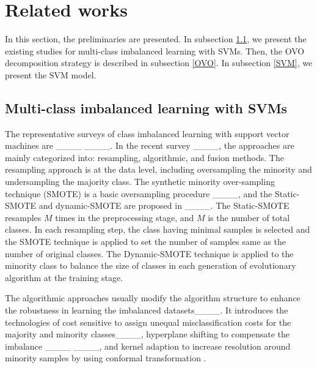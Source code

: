 \section{Related works}
\label{RelatedWork}

In this section, the preliminaries are presented. In subsection \ref{ImbalancedDatasets}, we present the existing studies for multi-class imbalanced learning with SVMs. Then, the OVO decomposition strategy is described in subsection \ref{OVO}. In subsection \ref{SVM}, we present the SVM model. 


\subsection{Multi-class imbalanced learning with SVMs}
\label{ImbalancedDatasets}


The representative surveys of class imbalanced learning with support vector machines are ____ ____. In the recent survey ____, the approaches are mainly categorized into: resampling, algorithmic, and fusion methods. The resampling approach is at the data level, including oversampling the minority and undersampling the majority class. The synthetic minority over-sampling technique (SMOTE) is a basic oversampling procedure ____, and the Static-SMOTE and dynamic-SMOTE are proposed in ____. The Static-SMOTE resamples $M$ times in the preprocessing stage, and $M$ is the number of total classes. In each resampling step, the class having minimal samples is selected and the SMOTE technique is applied to set the number of samples same as the number of original classes. The Dynamic-SMOTE technique is applied to the minority class to balance the size of classes in each generation of evolutionary algorithm at the training stage.


The algorithmic approaches usually modify the algorithm structure to enhance the robustness in learning the imbalanced datasets____. It introduces the technologies of cost sensitive to assign unequal misclassification costs for the majority and minority classes____, hyperplane shifting to compensate the imbalance ____ ____, and kernel adaption to increase resolution around minority samples by using conformal transformation \cite {kernel} \cite {kernal2023}. 

